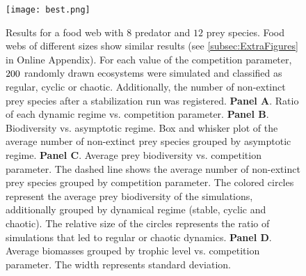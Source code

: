 \begin{figure}
	\begin{center}
		\texttt{[image: best.png]}
	\end{center}
	\caption{Results for a food web with $8$ predator and $12$ prey species. Food webs of different sizes show similar results (see \ref{subsec:ExtraFigures} in Online Appendix). For each value of the competition parameter, $200$ randomly drawn ecosystems were simulated and classified as regular, cyclic or chaotic. Additionally, the number of non-extinct prey species after a stabilization run was registered. \textbf{Panel A}. Ratio of each dynamic regime vs. competition parameter. \textbf{Panel B}. Biodiversity vs. asymptotic regime. Box and whisker plot of the average number of non-extinct prey species grouped by asymptotic regime. \textbf{Panel C}. Average prey biodiversity vs. competition parameter. The dashed line shows the average number of non-extinct prey species grouped by competition parameter. The colored circles represent the average prey biodiversity of the simulations, additionally grouped by dynamical regime (stable, cyclic and chaotic). The relative size of the circles represents the ratio of simulations that led to regular or chaotic dynamics. \textbf{Panel D}. Average biomasses grouped by trophic level vs. competition parameter. The width represents standard deviation.}
	\label{fig:Biodiversity}
\end{figure}